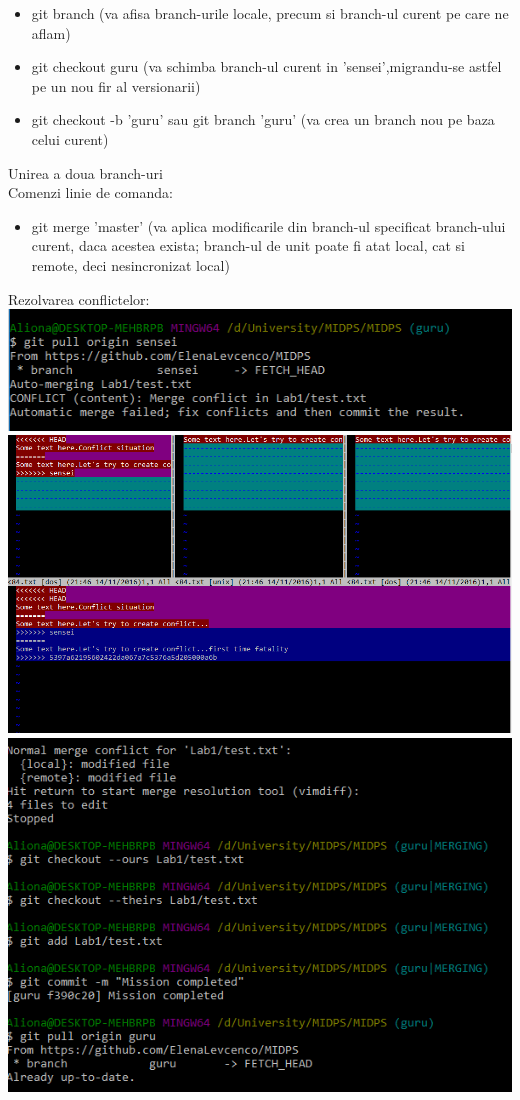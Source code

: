 \documentclass[12pt]{article}
\begin{document}
\begin{itemize}
\item  git branch (va afisa branch-urile locale, precum si branch-ul curent pe care ne aflam)
\item git checkout guru (va schimba branch-ul curent in 'sensei',migrandu-se astfel pe un nou fir al versionarii)
\item  git checkout -b 'guru' sau git branch 'guru' (va crea un branch
nou pe baza celui curent)
\end{itemize}
Unirea a doua branch-uri\\Comenzi linie de comanda:
\begin{itemize}
\item git merge 'master' (va aplica modificarile din branch-ul specificat
branch-ului curent, daca acestea exista; branch-ul de unit poate fi atat local, cat si remote,
deci nesincronizat local)
\end{itemize}
Rezolvarea conflictelor:\\
\includegraphics{conflict_detected.png}\\

\includegraphics{conflict_text.png}\\

\includegraphics{resolve_conflict.png}\\
\end{document}
